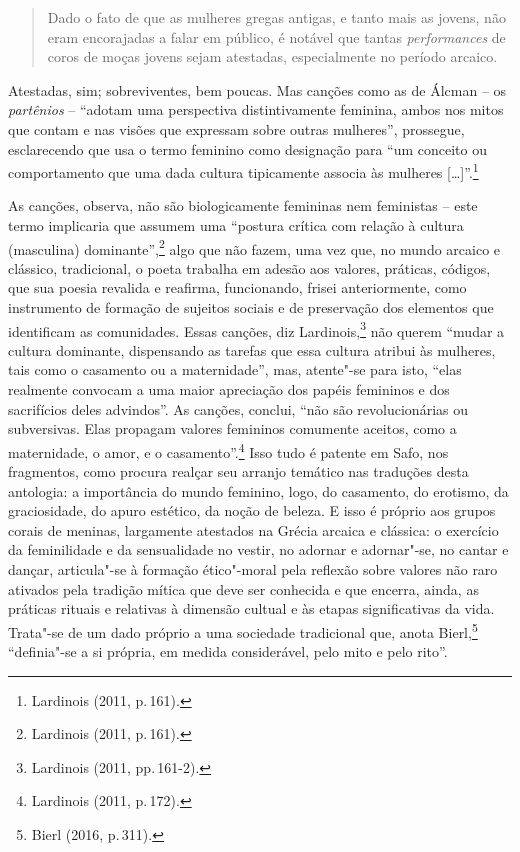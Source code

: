 \begin{quote}
Dado o fato de que as mulheres gregas antigas, e tanto mais as jovens, não eram encorajadas a falar em público, é notável que tantas \textit{performances} de coros de moças jovens sejam atestadas, especialmente no período arcaico.
\end{quote}

Atestadas, sim; sobreviventes, bem poucas. Mas canções como as de Álcman -- os \textit{partênios} -- ``adotam uma perspectiva distintivamente feminina, ambos nos mitos que contam e nas visões que expressam sobre outras mulheres'', prossegue, esclarecendo que usa o termo feminino como designação para ``um conceito ou comportamento que uma dada cultura tipicamente associa às mulheres [\ldots{}]''.\footnote{Lardinois (2011, p.\,161).}

As canções, observa, não são biologicamente femininas nem feministas -- este termo implicaria que assumem uma “postura crítica com relação à cultura (masculina) dominante”,\footnote{Lardinois (2011, p.\,161).} algo que não fazem, uma vez que, no mundo arcaico e clássico, tradicional, o poeta trabalha em adesão aos valores, práticas, códigos, que sua poesia revalida e reafirma, funcionando, frisei anteriormente, como instrumento de formação de sujeitos sociais e de preservação dos elementos que identificam as comunidades. Essas canções, diz Lardinois,\footnote{Lardinois (2011, pp.\,161-2).} não querem “mudar a cultura dominante, dispensando as tarefas que essa cultura atribui às mulheres, tais como o casamento ou a maternidade”, mas, atente"-se para isto, “elas realmente convocam a uma maior apreciação dos papéis femininos e dos sacrifícios deles advindos”. As canções, conclui, “não são revolucionárias ou subversivas. Elas propagam valores femininos comumente aceitos, como a maternidade, o amor, e o casamento”.\footnote{Lardinois (2011, p.\,172).} Isso tudo é patente em Safo, nos fragmentos, como procura realçar seu arranjo temático nas traduções desta antologia: a importância do mundo feminino, logo, do casamento, do erotismo, da graciosidade, do apuro estético, da noção de beleza. E isso é próprio aos grupos corais de meninas, largamente atestados na Grécia arcaica e clássica: o exercício da feminilidade e da sensualidade no vestir, no adornar e adornar"-se, no cantar e dançar, articula"-se à formação ético"-moral pela reflexão sobre valores não raro ativados pela tradição mítica que deve ser conhecida e que encerra, ainda, as práticas rituais e relativas à dimensão cultual e às etapas significativas da vida. Trata"-se de um dado próprio a uma sociedade tradicional que, anota Bierl,\footnote{Bierl (2016, p.\,311).} “definia"-se a si própria, em medida considerável, pelo mito e pelo rito”. 


